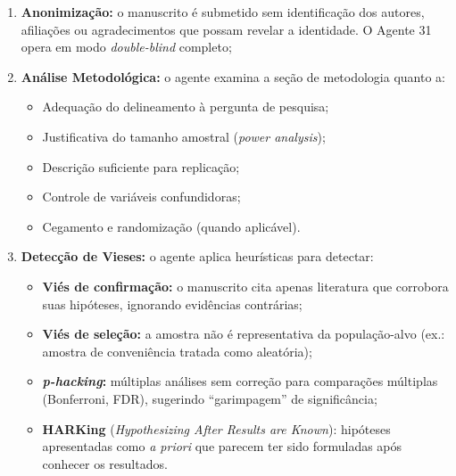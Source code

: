 \begin{enumerate}
    \item \textbf{Anonimização:} o manuscrito é submetido sem
    identificação dos autores, afiliações ou agradecimentos que
    possam revelar a identidade. O Agente 31 opera em modo
    \textit{double-blind} completo;

    \item \textbf{Análise Metodológica:} o agente examina a seção
    de metodologia quanto a:

    \begin{itemize}
        \item Adequação do delineamento à pergunta de pesquisa;

        \item Justificativa do tamanho amostral (\textit{power
        analysis});

        \item Descrição suficiente para replicação;

        \item Controle de variáveis confundidoras;

        \item Cegamento e randomização (quando aplicável).
    \end{itemize}

    \item \textbf{Detecção de Vieses:} o agente aplica heurísticas
    para detectar:

    \begin{itemize}
        \item \textbf{Viés de confirmação:} o manuscrito cita
        apenas literatura que corrobora suas hipóteses, ignorando
        evidências contrárias;

        \item \textbf{Viés de seleção:} a amostra não é
        representativa da população-alvo (ex.: amostra de
        conveniência tratada como aleatória);

        \item \textbf{\textit{p-hacking}:} múltiplas análises sem
        correção para comparações múltiplas (Bonferroni, FDR),
        sugerindo ``garimpagem'' de significância;

        \item \textbf{HARKing} (\textit{Hypothesizing After Results
        are Known}): hipóteses apresentadas como \textit{a priori}
        que parecem ter sido formuladas após conhecer os resultados.
    \end{itemize}


\end{enumerate}
